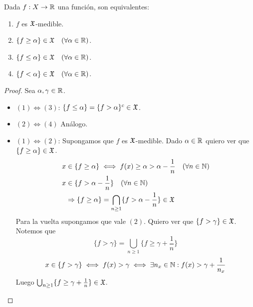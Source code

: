 \begin{lemma}
    Dada $f: X \to \mathbb{R}$ una función, son equivalentes:
    \begin{enumerate}
        \item $f$ es $\mathfrak{X}$-medible.
        \item $\{ f \geq \alpha \} \in \mathfrak{X} \quad (\forall \alpha \in \mathbb{R})$.
        \item $\{ f \leq \alpha \} \in \mathfrak{X} \quad (\forall \alpha \in \mathbb{R})$.
        \item $\{ f < \alpha \} \in \mathfrak{X} \quad (\forall \alpha \in \mathbb{R})$.
    \end{enumerate}

    \begin{proof}
        Sea $\alpha, \gamma \in \mathbb{R}$.
        \begin{itemize}
            \item $(1) \iff (3)$: $\{ f \leq \alpha \} = \{ f > \alpha \}^c \in \mathfrak{X}$.
            \item $(2) \iff (4)$ Análogo.
            \item $(1) \iff (2)$: Supongamos que $f$ es $\mathfrak{X}$-medible. Dado $\alpha \in \mathbb{R}$ quiero ver que $\{ f \geq \alpha \} \in \mathfrak{X}$.
                  \begin{align*}
                      x & \in \{ f \geq \alpha \} \iff f(x) \geq \alpha > \alpha - \frac{1}{n} \quad (\forall n \in \mathbb{N})  \\
                      x & \in \{ f > \alpha - \frac{1}{n} \} \quad (\forall n \in \mathbb{N})                                    \\
                        & \Rightarrow \{ f \geq \alpha \} = \bigcap_{n \geq 1} \{ f > \alpha - \frac{1}{n} \} \in \mathfrak{X}
                  \end{align*}
                  Para la vuelta supongamos que vale $(2)$. Quiero ver que $\{ f > \gamma \} \in \mathfrak{X}$. Notemos que
                  \begin{equation*}
                      \{ f > \gamma \} = \bigcup_{n \geq 1} \{ f \geq \gamma + \frac{1}{n} \}
                  \end{equation*}
                  \begin{equation*}
                      x \in \{ f > \gamma \} \iff f(x) > \gamma \iff \exists n_x \in \mathbb{N} : f(x) > \gamma + \frac{1}{n_x}
                  \end{equation*}
                  Luego $\bigcup_{n \geq 1} \{ f \geq \gamma + \frac{1}{n} \} \in \mathfrak{X}$.
        \end{itemize}
    \end{proof}
\end{lemma}

